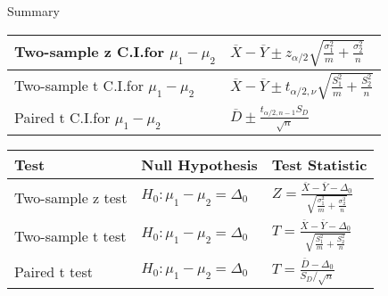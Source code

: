 \documentclass[t,handout]{beamer}
\begin{document}
    \begin{frame}{Summary}

        \vspace{-.6cm}
        \renewcommand*{\arraystretch}{1.4}
        \begin{center}
        \begin{tabular}{|p{5cm}|l|}
        \hline
        Two-sample z C.I.\@ for $\mu_1-\mu_2$  & $\overline{X} - \overline{Y} \pm z_{\alpha/2}\sqrt{\frac{\sigma_1^2}m+\frac{\sigma_2^2}n}$ \\ \hline
        Two-sample t C.I.\@ for $\mu_1-\mu_2$ & $\overline{X} - \overline{Y} \pm t_{\alpha/2,\nu}\sqrt{\frac{S_1^2}m+\frac{S_2^2}n}$ \\ \hline
        Paired t C.I.\@ for $\mu_1-\mu_2$ & 
        $\displaystyle\overline D \pm \frac{t_{\alpha/2,n-1}S_D}{\sqrt{n}}$ \\ \hline
        \end{tabular}
        \end{center}
        
        \vspace{-.3cm}
        \begin{center}
        \begin{tabular}{|p{1.2in}|l|l|} \hline
        Test & Null Hypothesis & Test Statistic  \\ \hline
        Two-sample z test & $H_0: \mu_1-\mu_2=\Delta_0$ &$Z=\frac{\overline X-\overline Y-\Delta_0}{\sqrt{\frac{\sigma_1^2}m+\frac{\sigma_2^2}n}}$  \\ \hline
        Two-sample t test & $H_0: \mu_1-\mu_2=\Delta_0$ & $T=\frac{\overline X-\overline Y-\Delta_0}{\sqrt{\frac{S_1^2}m+\frac{S_2^2}n}}$  \\ \hline
        Paired t test & $H_0: \mu_1-\mu_2=\Delta_0$ & $T=\frac{\overline D-\Delta_0}{S_D/\sqrt n}$  \\ \hline
        \end{tabular}
        \end{center}
        
        \end{frame}
\end{document}
